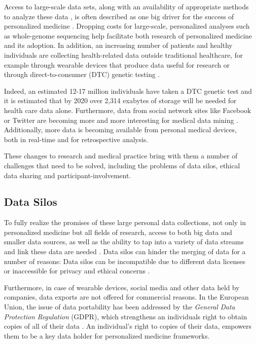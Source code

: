 \documentclass[a4paper,num-refs]{oup-contemporary}
\begin{document}
Access to large-scale data sets, along with an availability of appropriate methods to analyze these data \cite{Dilsizian2013, Moon2007}, is often described as one big driver for the success of personalized medicine \cite{Kohane2015}. Dropping costs for large-scale, personalized analyses such as whole-genome sequencing \cite{wetterstrand} help facilitate both research of personalized medicine and its adoption. In addition, an increasing number of patients and healthy individuals are collecting health-related data outside traditional healthcare, for example through wearable devices \cite{Swan2009} that produce data useful for research \cite{Gay2015} or through direct-to-consumer (DTC) genetic testing \cite{Corpas2015}.

Indeed, an estimated 12-17 million individuals have taken a DTC genetic test \cite{growthancestry, growthancestry2} and it is estimated that by 2020 over 2,314 exabytes of storage will be needed for health care data \cite{emc} alone. Furthermore, data from social network sites like Facebook or Twitter are becoming more and more interesting for medical data mining \cite{Rozenblum2013}. Additionally, more data is becoming available from personal medical devices, both in real-time and for retrospective analysis. 

These changes to research and medical practice bring with them a number of challenges that need to be solved, including the problems of data silos, ethical data sharing and participant-involvement.

\subsection{Data Silos}
To fully realize the promises of these large personal data collections, not only in personalized medicine but all fields of research, access to both big data and smaller data sources, as well as the ability to tap into a variety of data streams and link these data are needed \cite{Weber2014, Kohane2015}. Data silos can hinder the merging of data for a number of reasons: Data silos can be incompatible due to different data licenses \cite{Carbon2018} or inaccessible for privacy and ethical concerns \cite{Blasimme2018, Kossmann2014, Tenopir2011}. 

Furthermore, in case of wearable devices, social media and other data held by companies, data exports are not offered for commercial reasons. In the European Union, the issue of data portability has been addressed by the \emph{General Data Protection Regulation} (GDPR), which strengthens an individuals right to obtain copies of all of their data \cite{DeHert2018}. An individual's right to copies of their data, empowers them to be a key data holder for personalized medicine frameworks. 
\end{document}
